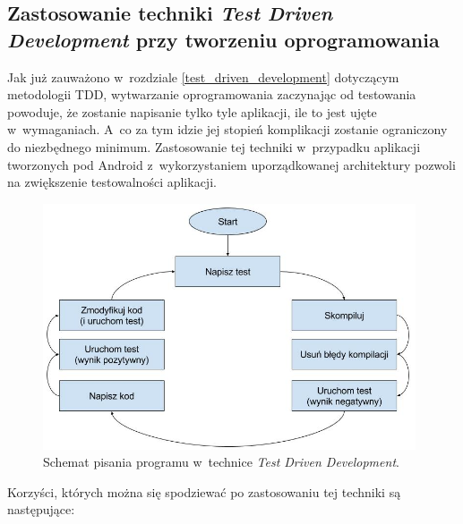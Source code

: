 \subsection{Zastosowanie techniki \textit{Test Driven Development} \newline przy tworzeniu oprogramowania}
\label{wybor_tdd}
Jak już zauważono w~rozdziale \ref{test_driven_development} dotyczącym metodologii TDD, wytwarzanie oprogramowania zaczynając od testowania powoduje, że zostanie napisanie tylko tyle aplikacji, ile to jest ujęte w~wymaganiach. A~co za tym idzie jej stopień komplikacji zostanie ograniczony do niezbędnego minimum. Zastosowanie tej techniki w~przypadku aplikacji tworzonych pod Android z~wykorzystaniem uporządkowanej architektury pozwoli na zwiększenie testowalności aplikacji. 

\begin{figure}[!htb]
    \centering
    \includegraphics[width=11cm]{imgs/ch4_tdd_pl.jpg}
    \caption
{Schemat pisania programu w~technice \textit{Test Driven Development}.}
    \label{fig:tdd_schema}
\end{figure} 

Korzyści, których można się spodziewać po zastosowaniu tej techniki są następujące:

